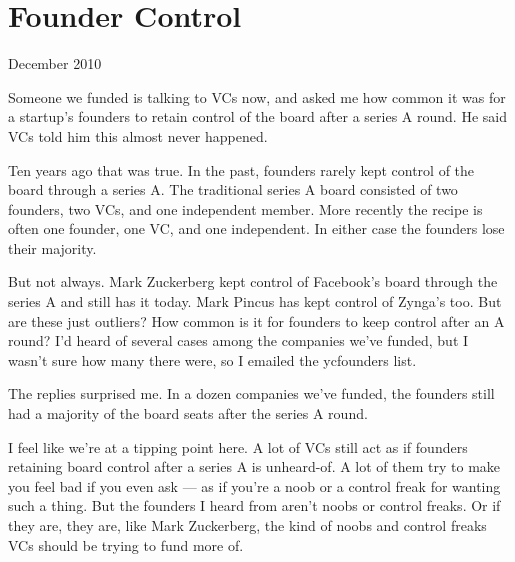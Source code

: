 \chapter{Founder Control}


            
              
                


                  
                    December 2010

Someone we funded is talking to VCs
                    now, and asked me how common it was for a startup's founders
                    to retain control of the board after a series A round. He
                    said VCs told him this almost never happened.

Ten
                    years ago that was true. In the past, founders rarely kept
                    control of the board through a series A. The traditional
                    series A board consisted of two founders, two VCs, and one
                    independent member. More recently the recipe is often one
                    founder, one VC, and one independent. In either case the
                    founders lose their majority.

But not always.
                    Mark Zuckerberg kept control of Facebook's board through the
                    series A and still has it today. Mark Pincus has kept
                    control of Zynga's too. But are these just outliers? How
                    common is it for founders to keep control after an A round?
                    I'd heard of several cases among the companies we've funded,
                    but I wasn't sure how many there were, so I emailed the
                    ycfounders list.

The replies surprised me. In a
                    dozen companies we've funded, the founders still had a
                    majority of the board seats after the series A round.

I
                    feel like we're at a tipping point here. A lot of VCs still
                    act as if founders retaining board control after a series A
                    is unheard-of. A lot of them try to make you feel bad if you
                    even ask --- as if you're a noob or a control freak for
                    wanting such a thing. But the founders I heard from aren't
                    noobs or control freaks. Or if they are, they are, like Mark
                    Zuckerberg, the kind of noobs and control freaks VCs should
                    be trying to fund more of.


